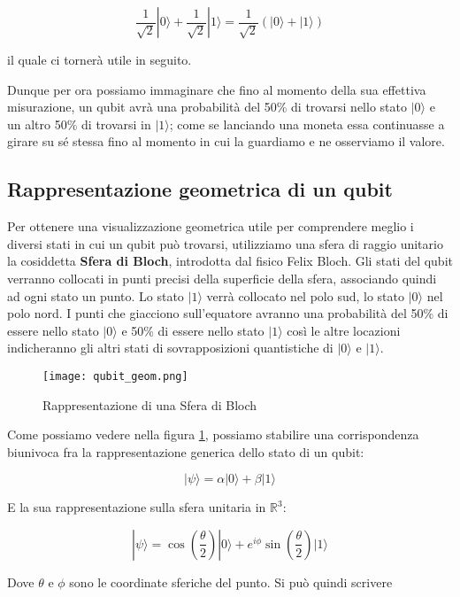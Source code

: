 \[
  \frac{1}{\sqrt{2}} | 0 \rangle
  + \frac{1}{\sqrt{2}} | 1 \rangle
  = \frac{1}{\sqrt{2}} (| 0 \rangle + | 1 \rangle)
\]

il quale ci tornerà utile in seguito.

Dunque per ora possiamo immaginare che fino al momento della sua effettiva misurazione, un qubit avrà una probabilità del 50\% di trovarsi nello stato \( | 0 \rangle \) e un altro 50\% di trovarsi in \( | 1 \rangle \); come se lanciando una moneta essa continuasse a girare su sé stessa fino al momento in cui la guardiamo e ne osserviamo il valore.

\subsection{Rappresentazione geometrica di un qubit}
Per ottenere una visualizzazione geometrica utile per comprendere meglio i diversi stati in cui un qubit può trovarsi, utilizziamo una sfera di raggio unitario la cosiddetta \textbf{Sfera di Bloch}, introdotta dal fisico Felix Bloch.
Gli stati del qubit verranno collocati in punti precisi della superficie della sfera, associando quindi ad ogni stato un punto. Lo stato \( | 1 \rangle \) verrà collocato nel polo sud, lo stato \( | 0 \rangle \) nel polo nord. I punti che giacciono sull'equatore avranno una probabilità del 50\% di essere nello stato \( | 0 \rangle \) e 50\% di essere nello stato \( | 1 \rangle \) così le altre locazioni indicheranno gli altri stati di sovrapposizioni quantistiche di \( | 0 \rangle \) e \( | 1 \rangle \).

\begin{figure}[h]
  \centering
  \texttt{[image: qubit\_geom.png]}
  \caption{Rappresentazione di una Sfera di Bloch}
  \label{fig:qubit_geom}
\end{figure}

Come possiamo vedere nella figura \ref{fig:qubit_geom}, possiamo stabilire una corrispondenza biunivoca fra la rappresentazione generica dello stato di un qubit:

\[
  | \psi \rangle
  = \alpha | 0 \rangle
  + \beta | 1 \rangle
\]

E la sua rappresentazione sulla sfera unitaria in \( \mathbb{R} ^3 \):

\[
  | \psi \rangle
  = \cos \left( \frac{\theta}{2} \right)
  | 0 \rangle
  + e^{i\phi}
  \sin \left( \frac{\theta}{2} \right)
  | 1 \rangle
\]

Dove \( \theta \) e \( \phi \) sono le coordinate sferiche del punto. Si può quindi scrivere

